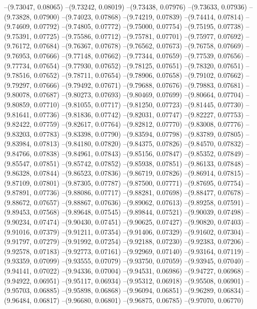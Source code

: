 --(9.73047, 0.08065)
--(9.73242, 0.08019)
--(9.73438, 0.07976)
--(9.73633, 0.07936)
--(9.73828, 0.07900)
--(9.74023, 0.07868)
--(9.74219, 0.07839)
--(9.74414, 0.07814)
--(9.74609, 0.07792)
--(9.74805, 0.07772)
--(9.75000, 0.07754)
--(9.75195, 0.07738)
--(9.75391, 0.07725)
--(9.75586, 0.07712)
--(9.75781, 0.07701)
--(9.75977, 0.07692)
--(9.76172, 0.07684)
--(9.76367, 0.07678)
--(9.76562, 0.07673)
--(9.76758, 0.07669)
--(9.76953, 0.07666)
--(9.77148, 0.07662)
--(9.77344, 0.07659)
--(9.77539, 0.07656)
--(9.77734, 0.07654)
--(9.77930, 0.07652)
--(9.78125, 0.07651)
--(9.78320, 0.07651)
--(9.78516, 0.07652)
--(9.78711, 0.07654)
--(9.78906, 0.07658)
--(9.79102, 0.07662)
--(9.79297, 0.07666)
--(9.79492, 0.07671)
--(9.79688, 0.07676)
--(9.79883, 0.07681)
--(9.80078, 0.07687)
--(9.80273, 0.07693)
--(9.80469, 0.07699)
--(9.80664, 0.07704)
--(9.80859, 0.07710)
--(9.81055, 0.07717)
--(9.81250, 0.07723)
--(9.81445, 0.07730)
--(9.81641, 0.07736)
--(9.81836, 0.07742)
--(9.82031, 0.07747)
--(9.82227, 0.07753)
--(9.82422, 0.07759)
--(9.82617, 0.07764)
--(9.82812, 0.07770)
--(9.83008, 0.07776)
--(9.83203, 0.07783)
--(9.83398, 0.07790)
--(9.83594, 0.07798)
--(9.83789, 0.07805)
--(9.83984, 0.07813)
--(9.84180, 0.07820)
--(9.84375, 0.07826)
--(9.84570, 0.07832)
--(9.84766, 0.07838)
--(9.84961, 0.07843)
--(9.85156, 0.07847)
--(9.85352, 0.07849)
--(9.85547, 0.07851)
--(9.85742, 0.07852)
--(9.85938, 0.07851)
--(9.86133, 0.07848)
--(9.86328, 0.07844)
--(9.86523, 0.07836)
--(9.86719, 0.07826)
--(9.86914, 0.07815)
--(9.87109, 0.07801)
--(9.87305, 0.07787)
--(9.87500, 0.07771)
--(9.87695, 0.07754)
--(9.87891, 0.07736)
--(9.88086, 0.07717)
--(9.88281, 0.07698)
--(9.88477, 0.07678)
--(9.88672, 0.07657)
--(9.88867, 0.07636)
--(9.89062, 0.07613)
--(9.89258, 0.07591)
--(9.89453, 0.07568)
--(9.89648, 0.07545)
--(9.89844, 0.07521)
--(9.90039, 0.07498)
--(9.90234, 0.07474)
--(9.90430, 0.07451)
--(9.90625, 0.07427)
--(9.90820, 0.07403)
--(9.91016, 0.07379)
--(9.91211, 0.07354)
--(9.91406, 0.07329)
--(9.91602, 0.07304)
--(9.91797, 0.07279)
--(9.91992, 0.07254)
--(9.92188, 0.07230)
--(9.92383, 0.07206)
--(9.92578, 0.07183)
--(9.92773, 0.07161)
--(9.92969, 0.07140)
--(9.93164, 0.07119)
--(9.93359, 0.07099)
--(9.93555, 0.07079)
--(9.93750, 0.07059)
--(9.93945, 0.07040)
--(9.94141, 0.07022)
--(9.94336, 0.07004)
--(9.94531, 0.06986)
--(9.94727, 0.06968)
--(9.94922, 0.06951)
--(9.95117, 0.06934)
--(9.95312, 0.06918)
--(9.95508, 0.06901)
--(9.95703, 0.06885)
--(9.95898, 0.06868)
--(9.96094, 0.06851)
--(9.96289, 0.06834)
--(9.96484, 0.06817)
--(9.96680, 0.06801)
--(9.96875, 0.06785)
--(9.97070, 0.06770)
